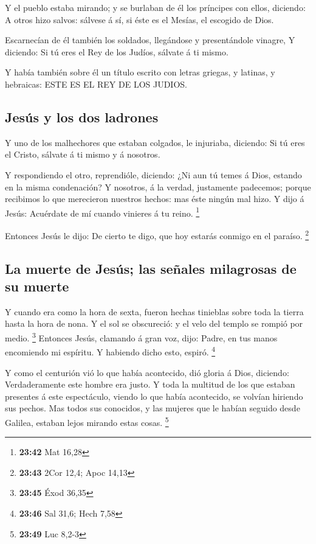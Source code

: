  Y el pueblo estaba mirando; y se burlaban de él los
príncipes con ellos, diciendo: A otros hizo salvos: sálvese á sí, si
éste es el Mesías, el escogido de Dios.

 Escarnecían de él también los soldados, llegándose y
presentándole vinagre,  Y diciendo: Si tú eres el Rey de
los Judíos, sálvate á ti mismo.

 Y había también sobre él un título escrito con letras
griegas, y latinas, y hebraicas: ESTE ES EL REY DE LOS JUDIOS.

\hypertarget{jesuxfas-y-los-dos-ladrones}{%
\subsection{Jesús y los dos
ladrones}\label{jesuxfas-y-los-dos-ladrones}}

 Y uno de los malhechores que estaban colgados, le
injuriaba, diciendo: Si tú eres el Cristo, sálvate á ti mismo y á
nosotros.

 Y respondiendo el otro, reprendióle, diciendo: ¿Ni aun tú
temes á Dios, estando en la misma condenación?  Y nosotros,
á la verdad, justamente padecemos; porque recibimos lo que merecieron
nuestros hechos: mas éste ningún mal hizo.  Y dijo á Jesús:
Acuérdate de mí cuando vinieres á tu reino. \footnote{\textbf{23:42} Mat
  16,28}

 Entonces Jesús le dijo: De cierto te digo, que hoy estarás
conmigo en el paraíso. \footnote{\textbf{23:43} 2Cor 12,4; Apoc 14,13}

\hypertarget{la-muerte-de-jesuxfas-las-seuxf1ales-milagrosas-de-su-muerte}{%
\subsection{La muerte de Jesús; las señales milagrosas de su
muerte}\label{la-muerte-de-jesuxfas-las-seuxf1ales-milagrosas-de-su-muerte}}

 Y cuando era como la hora de sexta, fueron hechas
tinieblas sobre toda la tierra hasta la hora de nona.  Y el
sol se obscureció: y el velo del templo se rompió por medio. \footnote{\textbf{23:45}
  Éxod 36,35}  Entonces Jesús, clamando á gran voz, dijo:
Padre, en tus manos encomiendo mi espíritu. Y habiendo dicho esto,
espiró. \footnote{\textbf{23:46} Sal 31,6; Hech 7,58}

 Y como el centurión vió lo que había acontecido, dió
gloria á Dios, diciendo: Verdaderamente este hombre era justo.
 Y toda la multitud de los que estaban presentes á este
espectáculo, viendo lo que había acontecido, se volvían hiriendo sus
pechos.  Mas todos sus conocidos, y las mujeres que le
habían seguido desde Galilea, estaban lejos mirando estas cosas.
\footnote{\textbf{23:49} Luc 8,2-3}

